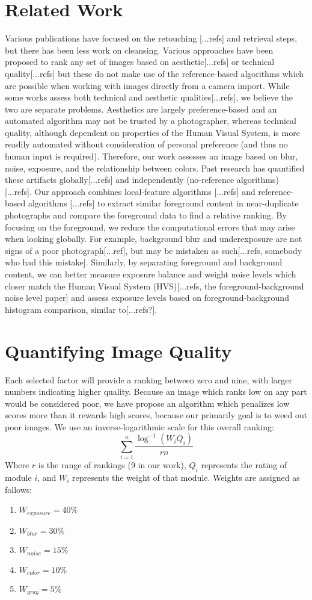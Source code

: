 \documentclass[twocolumn]{article}
\begin{document}
\section{Related Work}
Various publications have focused on the retouching [...refs] and retrieval\cite{Yeh:2010:PPR:1873951.1873963} steps, but there has been less work on cleansing.
Various approaches have been proposed to rank any set of images based on aesthetic[...refs] or technical quality[...refs] but these do not make use of the reference-based algorithms which are possible when working with images directly from a camera import. While some works assess both technical and aesthetic qualities[...refs], we believe the two are separate problems. Aesthetics are largely preference-based and an automated algorithm may not be trusted by a photographer, whereas technical quality, although dependent on properties of the Human Visual System, is more readily automated without consideration of personal preference (and thus no human input is required).
Therefore, our work assesses an image based on blur, noise, exposure, and the relationship between colors. Past research has quantified these artifacts globally[...refs] and independently (no-reference algorithms) [...refs]. Our approach combines local-feature algorithms [...refs] and reference-based algorithms [...refs] to extract similar foreground content in near-duplicate photographs and compare the foreground data to find a relative ranking. By focusing on the foreground, we reduce the computational errors that may arise when looking globally. For example, background blur and underexposure are not signs of a poor photograph[...ref], but may be mistaken as such[...refs, somebody who had this mistake].
Similarly, by separating foreground and background content, we can better measure exposure balance and weight noise levels which closer match the Human Visual System (HVS)[...refs, the foreground-background noise level paper] and assess exposure levels based on foreground-background histogram comparison, similar to[...refs?].
\section{Quantifying Image Quality}
Each selected factor will provide a ranking between zero and nine, with larger numbers indicating higher quality. Because an image which ranks low on any part would be considered poor, we have propose an algorithm which penalizes low scores more than it rewards high scores, because our primarily goal is to weed out poor images. We use an inverse-logarithmic scale for this overall ranking:
\[
\displaystyle\sum\limits_{i=1}^n\frac{\log^{-1}(W_iQ_i)}{rn}
\]
Where \(r\) is the range of rankings (9 in our work), \(Q_i\) represents the rating of module \(i\), and \(W_i\) represents the weight of that module. Weights are assigned as follows:
\begin{enumerate}
\item \(W_{exposure}=40\%\)
\item \(W_{blur}=30\%\)
\item \(W_{noise}=15\%\)
\item \(W_{color}=10\%\)
\item \(W_{gray}=5\%\)
\end{enumerate}
\end{document}
